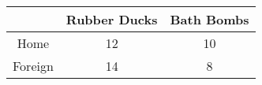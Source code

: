 \begin{table}[ht]
    \centering
    \begin{tabular}{|c|c|c|}
    \hline
     & Rubber Ducks & Bath Bombs \\
    \hline
    Home & 12 & 10 \\
    \hline
    Foreign & 14 & 8 \\
    \hline
    \end{tabular}
\end{table}